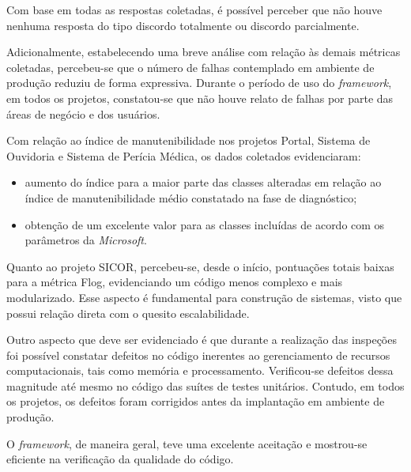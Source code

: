 Com base em todas as respostas coletadas, é possível perceber que não houve nenhuma resposta do tipo discordo totalmente ou discordo parcialmente. 

Adicionalmente, estabelecendo uma breve análise com relação às demais métricas coletadas, percebeu-se que o número de falhas contemplado em ambiente de produção reduziu de forma expressiva. Durante o período de uso do \textit{framework}, em todos os projetos, constatou-se que não houve relato de falhas por parte das áreas de negócio e dos usuários. 

Com relação ao índice de manutenibilidade nos projetos Portal, Sistema de Ouvidoria e Sistema de Perícia Médica, os dados coletados evidenciaram:

\begin{itemize}
	\item aumento do índice para a maior parte das classes alteradas em relação ao índice de manutenibilidade médio constatado na fase de diagnóstico;
	\item obtenção de um excelente valor para as classes incluídas de acordo com os parâmetros da \textit{Microsoft}.
\end{itemize}

Quanto ao projeto SICOR, percebeu-se, desde o início, pontuações totais baixas para a métrica Flog, evidenciando um código menos complexo e mais modularizado. Esse aspecto é fundamental para construção de sistemas, visto que possui relação direta com o quesito escalabilidade.

Outro aspecto que deve ser evidenciado é que durante a realização das inspeções foi possível constatar defeitos no código inerentes ao gerenciamento de recursos computacionais, tais como memória e processamento. Verificou-se defeitos dessa magnitude até mesmo no código das suítes de testes unitários. Contudo, em todos os projetos, os defeitos foram corrigidos antes da implantação em ambiente de produção.

O \textit{framework}, de maneira geral, teve uma excelente aceitação e mostrou-se eficiente na verificação da qualidade do código.

\clearpage